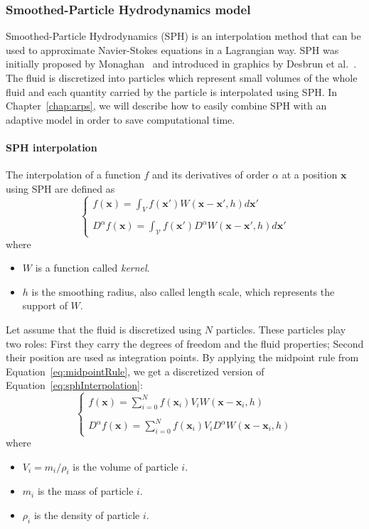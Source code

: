 \subsubsection{Smoothed-Particle Hydrodynamics model}
\label{subsubsec:starSPH}
Smoothed-Particle Hydrodynamics (SPH) is an interpolation method that can be used to approximate Navier-Stokes equations in a Lagrangian way. 
SPH was initially proposed by Monaghan~\cite{Monaghan1992} and introduced in graphics by Desbrun et al.~\cite{Desbrun1999}.
The fluid is discretized into particles which represent small volumes of the whole fluid and each quantity carried by the particle is interpolated using SPH.
In Chapter~\ref{chap:arps}, we will describe how to easily combine SPH with an adaptive model in order to save computational time.
\paragraph{SPH interpolation}
The interpolation of a function $f$ and its derivatives of order $\alpha$ at a position $\mathbf{x}$ using SPH are defined as
\begin{equation}
\label{eq:sphInterpolation}
\left\lbrace
\begin{array}{l}
\displaystyle f(\mathbf{x}) = \int_{V} f(\mathbf{x'})W(\mathbf{x}-\mathbf{x'}, h)d\mathbf{x'} \\ \\
\displaystyle D^{\alpha} f(\mathbf{x}) = \int_{\mathcal{V}} f(\mathbf{x'}) D^{\alpha} W(\mathbf{x}-\mathbf{x'}, h)d\mathbf{x'}
\end{array}
\right.
\end{equation}
where 
\begin{itemize}
	\item $W$ is a function called \emph{kernel}.
	\item $h$ is the smoothing radius, also called length scale, which represents the support of $W$.
\end{itemize} 
Let assume that the fluid is discretized using $N$ particles.
These particles play two roles: First they carry the degrees of freedom and the fluid properties; Second their position are used as integration points. By applying the midpoint rule from Equation~\eqref{eq:midpointRule}, we get a discretized version of Equation~\eqref{eq:sphInterpolation}:
\begin{equation}
\label{eq:sphFunction}
\left\lbrace
\begin{array}{l}
\displaystyle f(\mathbf{x}) = \sum_{i=0}^{N} f(\mathbf{x}_{i})V_{i} W(\mathbf{x}-\mathbf{x}_{i},h) \\ \\
\displaystyle D^{\alpha} f(\mathbf{x})= \sum_{i=0}^{N} f(\mathbf{x}_{i})V_{i} D^{\alpha} W(\mathbf{x}-\mathbf{x}_{i},h)
\end{array}
\right.
\end{equation}
where 
\begin{itemize}
	\item $V_{i} = m_{i}/\rho_{i}$ is the volume of particle $i$.
	\item $m_{i}$ is the mass of particle $i$.
	\item $\rho_{i}$ is the density of particle $i$.
\end{itemize}

